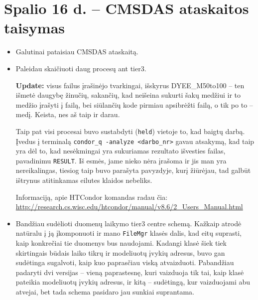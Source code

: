 \documentclass[a4paper, 12pt]{article}
\newcommand{\ttt}[1]{\texttt{#1}}
\begin{document}
\section{Spalio 16 d. -- CMSDAS ataskaitos taisymas}
\begin{itemize}
	\item Galutinai pataisiau CMSDAS ataskaitą.
	\item Paleidau skaičiuoti daug procesų ant tier3.
	
	\textbf{Update:} visus failus įrašinėjo tvarkingai, išskyrus DYEE\_M50to100 --
	ten išmetė daugybę žinučių, sakančių, kad neišeina sukurti šakų medžiui
	ir to medžio įrašyti į failą, bei siūlančių kode pirmiau apsibrėžti failą, o
	tik po to -- medį. Keista, nes aš taip ir darau.
	
	Taip pat visi procesai buvo sustabdyti (\ttt{held}) vietoje to, kad baigtų darbą.
	Įvedus į terminalą \ttt{condor\_q -analyze <darbo\_nr>} gavau atsakymą, kad taip yra
	dėl to, kad nesėkmingai yra sukuriamas rezultato išvesties failas, pavadinimu
	\ttt{RESULT}. Iš esmės, jame nieko nėra įrašoma ir jis man yra nereikalingas, tiesiog
	taip buvo parašyta pavyzdyje, kurį žiūrėjau, tad galbūt ištrynus atitinkamas eilutes
	klaidos nebeliks.
	
	Informaciją, apie HTCondor komandas radau čia:
	\url{http://research.cs.wisc.edu/htcondor/manual/v8.6/2_Users_Manual.html}
	
	\item Bandžiau sudėlioti duomenų laikymo tier3 centre schemą. Kažkaip atrodė natūralu
	į ją įkomponuoti ir mano \ttt{FileMgr} klasės dalis, kad eitų suprasti, kaip
	konkrečiai tie duomenys bus naudojami. Kadangi klasė šiek tiek skirtingais būdais
	laiko tikrų ir modeliuotų įvykių adresus, buvo gan sudėtinga sugalvoti, kaip kuo
	paprasčiau viską atvaizduoti. Pabandžiau padaryti dvi versijas -- vieną paprastesnę,
	kuri vaizduoja tik tai, kaip klasė pateikia modeliuotų įvykių adresus, ir kitą --
	sudėtingą, kur vaizduojami abu atvejai, bet tada schema pasidaro jau sunkiai suprantama.
	

\end{itemize}
\end{document}
